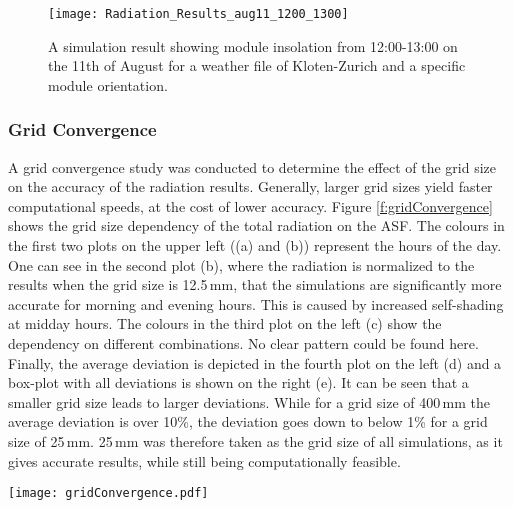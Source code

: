 			\begin{figure}[H]
			\begin{center}
				\texttt{[image: Radiation\_Results\_aug11\_1200\_1300]}
				\caption{A simulation result showing module insolation from 12:00-13:00 on the 11th of August for a weather file of Kloten-Zurich and a specific module orientation.}
				\label{fig:radiation}
			\end{center}
			\end{figure}

			\subsubsection{Grid Convergence}
			\label{ss:gridconvergence}

				A grid convergence study was conducted to determine the effect of the grid size on the accuracy of the radiation results. Generally, larger grid sizes yield faster computational speeds, at the cost of lower accuracy. Figure \ref{f:gridConvergence} shows the grid size dependency of the total radiation on the ASF. The colours in the first two plots on the upper left ((a) and (b)) represent the hours of the day. One can see in the second plot (b), where the radiation is normalized to the results when the grid size is 12.5\,mm, that the simulations are significantly more accurate for morning and evening hours. This is caused by increased self-shading at midday hours. The colours in the third plot on the left (c) show the dependency on different combinations. No clear pattern could be found here. Finally, the average deviation is depicted in the fourth plot on the left (d) and a box-plot with all deviations is shown on the right (e). It can be seen that a smaller grid size leads to larger deviations. While for a grid size of 400\,mm the average deviation is over 10\%, the deviation goes down to below 1\% for a grid size of 25\,mm. 25\,mm was therefore taken as the grid size of all simulations, as it gives accurate results, while still being computationally feasible. 

				\begin{figure*}
					\begin{center}
					\texttt{[image: gridConvergence.pdf]}
					\caption{Grid convergence evaluation, showing the deviations of the radiation in dependence of the grid size, time of the day and panel orientation. (a) shows the total radiation on the panels in dependence of the hour of the day, (b) depicts the same results, but normalized to the results with the smallest grid size, (c) presents the influence of the panel orientation, (d) plots the average deviation from the smallest grid size and (e) visualises all deviations with the usage of box-plots.}
					\label{f:gridConvergence}
					\end{center}
				\end{figure*}


